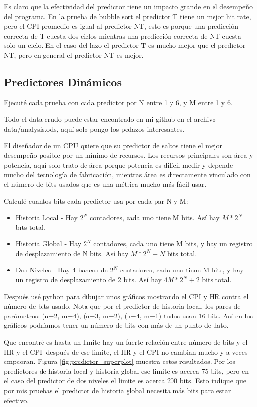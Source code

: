 \documentclass[a4paper]{article}
\begin{document}
Es claro que la efectividad del predictor tiene un impacto grande en el desempeño del programa. En la prueba de bubble sort el predictor T tiene un mejor hit rate, pero el CPI promedio es igual al predictor NT, esto es porque una predicción correcta de T cuesta dos ciclos mientras una predicción correcta de NT cuesta solo un ciclo. En el caso del lazo el predictor T es mucho mejor que el predictor NT, pero en general el predictor NT es mejor.

\subsection{Predictores Dinámicos}

Ejecuté cada prueba con cada predictor por N entre 1 y 6, y M entre 1 y 6.

Todo el data crudo puede estar encontrado en mi github en el archivo data/analysis.ods, aquí solo pongo los pedazos interesantes.

El diseñador de un CPU quiere que su predictor de saltos tiene el mejor desempeño posible por un mínimo de recursos. Los recursos principales son área y potencia, aquí solo trato de área porque potencia es difícil medir y depende mucho del tecnología de fabricación, mientras área es directamente vinculado con el número de bits usados que es una métrica mucho más fácil usar.

Calculé cuantos bits cada predictor usa por cada par N y M:

\begin{itemize}
    \item Historia Local - Hay $2^N$ contadores, cada uno tiene M bits. Así hay $ M * 2^N $ bits total.
    \item Historia Global - Hay $2^N$ contadores, cada uno tiene M bits, y hay un registro de desplazamiento de N bits. Así hay $ M * 2^N + N $ bits total.
    \item Dos Niveles - Hay 4 bancos de $2^N$ contadores, cada uno tiene M bits, y hay un registro de desplazamiento de 2 bits. Así hay $ 4M * 2^N + 2 $ bits total.
\end{itemize}

Después usé python para dibujar unos gráficos mostrando el CPI y HR contra el número de bits usado. Nota que por el predictor de historia local, los pares de parámetros: (n=2, m=4), (n=3, m=2), (n=4, m=1) todos usan 16 bits. Así en los gráficos podríamos tener un número de bits con más de un punto de dato.

Que encontré es hasta un limite hay un fuerte relación entre número de bits y el HR y el CPI, después de ese limite, el HR y el CPI no cambian mucho y a veces empeoran. Figura \ref{fig:predictor_superplot} muestra estos resultados. Por los predictores de historia local y historia global ese limite es acerca 75 bits, pero en el caso del predictor de dos niveles el limite es acerca 200 bits. Esto indique que por mis pruebas el predictor de historia global necesita más bits para estar efectivo.
\end{document}
